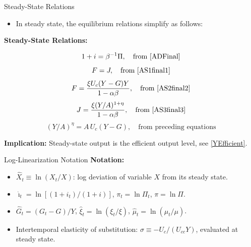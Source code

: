 \documentclass[11pt,aspectratio=169]{beamer}
\begin{document}
\begin{frame}[label=SteadyStateRelations]{Steady-State Relations}
\small

\begin{itemize}
  \item In steady state, the equilibrium relations simplify as follows:
\end{itemize}

\textbf{Steady-State Relations:}

\begin{equation}
1 + i = \beta^{-1} \Pi, \quad \text{from \eqref{ADFinal}}
\label{SS1}
\end{equation}
\begin{equation}
F = J, \quad \text{from \eqref{AS1final1}}
\label{SS2}
\end{equation}
\begin{equation}
F = \frac{\xi U_c(Y-G) Y}{1 - \alpha \beta}, \quad \text{from \eqref{AS2final2}}
\label{SS3}
\end{equation}
\begin{equation}
J = \frac{\xi (Y/A)^{1+\eta}}{1 - \alpha \beta}, \quad \text{from \eqref{AS3final3}}
\label{SS4}
\end{equation}
\begin{equation}
(Y/A)^{\eta} = A\,U_c(Y-G), \quad \text{from preceding equations}
\label{SS5}
\end{equation}

\textbf{Implication:}  
Steady-state output is the efficient output level, see \eqref{YEfficient}.

\end{frame}
\begin{frame}{Log-Linearization Notation}
\small
\textbf{Notation:}
\begin{itemize}
  \item $\hat{X}_t \equiv \ln(X_t/X)$: log deviation of variable $X$ from its steady state.
  \item $\hat{\imath}_t = \ln[(1+i_t)/(1+i)]$, $\pi_t = \ln \Pi_t$, $\pi = \ln \Pi$.
  \item $\hat{G}_t = (G_t - G)/Y$, $\hat{\xi}_t = \ln(\xi_t/\xi)$, $\hat{\mu}_t = \ln(\mu_t/\mu)$.
  \item Intertemporal elasticity of substitution: $\sigma \equiv - U_c / (U_{cc} Y)$, evaluated at steady state.
\end{itemize}
\end{frame}
\end{document}
